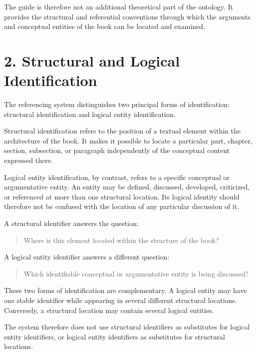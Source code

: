 The guide is therefore not an additional theoretical
part of the ontology. It provides the structural and
referential conventions through which the arguments
and conceptual entities of the book can be located
and examined.


\section*{2. Structural and Logical Identification}

The referencing system distinguishes two principal
forms of identification: structural identification
and logical entity identification.

Structural identification refers to the position of
a textual element within the architecture of the book.
It makes it possible to locate a particular part,
chapter, section, subsection, or paragraph independently
of the conceptual content expressed there.

Logical entity identification, by contrast, refers
to a specific conceptual or argumentative entity.
An entity may be defined, discussed, developed,
criticized, or referenced at more than one structural
location. Its logical identity should therefore not
be confused with the location of any particular
discussion of it.

A structural identifier answers the question:

\begin{quote}
Where is this element located within the structure
of the book?
\end{quote}

A logical entity identifier answers a different question:

\begin{quote}
Which identifiable conceptual or argumentative
entity is being discussed?
\end{quote}

These two forms of identification are complementary.
A logical entity may have one stable identifier while
appearing in several different structural locations.
Conversely, a structural location may contain several
logical entities.

The system therefore does not use structural identifiers
as substitutes for logical entity identifiers, or
logical entity identifiers as substitutes for
structural locations.

